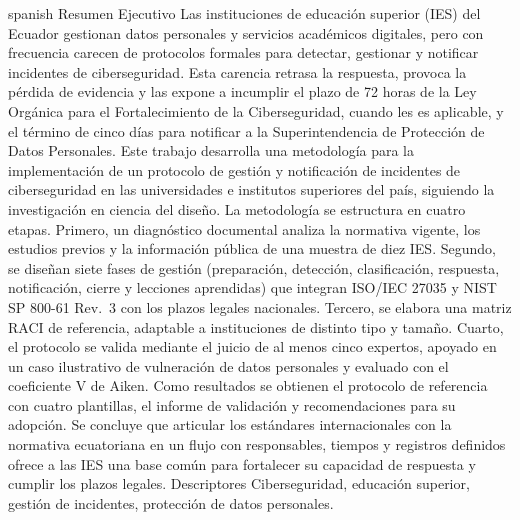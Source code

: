 \UTIResumenPagina
  {spanish}
  {Resumen Ejecutivo}
  {Las instituciones de educación superior (IES) del Ecuador gestionan datos personales y servicios académicos digitales, pero con frecuencia carecen de protocolos formales para detectar, gestionar y notificar incidentes de ciberseguridad. Esta carencia retrasa la respuesta, provoca la pérdida de evidencia y las expone a incumplir el plazo de 72 horas de la Ley Orgánica para el Fortalecimiento de la Ciberseguridad, cuando les es aplicable, y el término de cinco días para notificar a la Superintendencia de Protección de Datos Personales. Este trabajo desarrolla una metodología para la implementación de un protocolo de gestión y notificación de incidentes de ciberseguridad en las universidades e institutos superiores del país, siguiendo la investigación en ciencia del diseño. La metodología se estructura en cuatro etapas. Primero, un diagnóstico documental analiza la normativa vigente, los estudios previos y la información pública de una muestra de diez IES. Segundo, se diseñan siete fases de gestión (preparación, detección, clasificación, respuesta, notificación, cierre y lecciones aprendidas) que integran ISO/IEC 27035 y NIST SP 800-61 Rev.~3 con los plazos legales nacionales. Tercero, se elabora una matriz RACI de referencia, adaptable a instituciones de distinto tipo y tamaño. Cuarto, el protocolo se valida mediante el juicio de al menos cinco expertos, apoyado en un caso ilustrativo de vulneración de datos personales y evaluado con el coeficiente V de Aiken. Como resultados se obtienen el protocolo de referencia con cuatro plantillas, el informe de validación y recomendaciones para su adopción. Se concluye que articular los estándares internacionales con la normativa ecuatoriana en un flujo con responsables, tiempos y registros definidos ofrece a las IES una base común para fortalecer su capacidad de respuesta y cumplir los plazos legales.}
  {Descriptores}
  {Ciberseguridad, educación superior, gestión de incidentes, protección de datos personales.}
